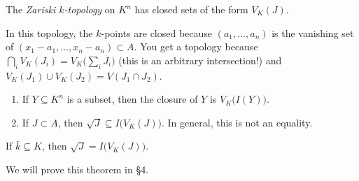  \begin{definition}
   The \emph{Zariski $k$-topology} on $K^n$ has closed sets of the form $V_K(J)$.
 \end{definition}
 In this topology, the $k$-points are closed because $(a_1,\dots,a_n)$ is the vanishing
 set of $(x_1-a_1,\dots, x_n-a_n)\subset A$. You get a topology because $\bigcap_i
 V_K(J_i)=V_K\bigl(\sum_i J_i\bigr)$ (this is an arbitrary intersection!) and
 $V_K(J_1)\cup V_K(J_2)=V(J_1\cap J_2)$.

 \begin{enumerate}
   \item If $Y\subseteq K^n$ is a subset, then the closure of $Y$ is
   $V_K\bigl(I(Y)\bigr)$.

   \item If $J\subset A$, then $\sqrt J\subseteq I\bigl(V_K(J)\bigr)$. In general, this is not
   an equality.
 \end{enumerate}
 \begin{theorem}
   If $\bar k\subseteq K$, then $\sqrt J= I\bigl(V_K(J)\bigr)$.
 \end{theorem}
 We will prove this theorem in \S 4.

